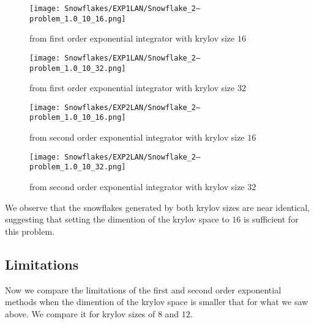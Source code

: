 \begin{figure}[H]
    \centering
    \begin{minipage}{0.49\textwidth}
        \texttt{[image: Snowflakes/EXP1LAN/Snowflake\_2--problem\_1.0\_10\_16.png]} %
        \caption{from first order exponential integrator with krylov size $16$}
        \label{fig:first order 16}
    \end{minipage}\hfill
    \centering
    \begin{minipage}{0.49\textwidth}
        \texttt{[image: Snowflakes/EXP1LAN/Snowflake\_2--problem\_1.0\_10\_32.png]} %
        \caption{from first order exponential integrator with krylov size $32$}
        \label{fig:first order 32}
    \end{minipage}\hfill
\end{figure}\begin{figure}[H]
    \centering
    \begin{minipage}{0.49\textwidth}
        \texttt{[image: Snowflakes/EXP2LAN/Snowflake\_2--problem\_1.0\_10\_16.png]} %
        \caption{from second order exponential integrator with krylov size $16$}
        \label{fig:second order 16}
    \end{minipage}\hfill
    \centering
    \begin{minipage}{0.49\textwidth}
        \texttt{[image: Snowflakes/EXP2LAN/Snowflake\_2--problem\_1.0\_10\_32.png]} %
        \caption{from second order exponential integrator with krylov size $32$}
        \label{fig:second order 32}
    \end{minipage}\hfill
\end{figure}

We observe that the snowflakes generated by both krylov sizes are near identical, 
suggesting that setting the dimention of the krylov space to $16$ is sufficient for this problem.\\

\subsection{Limitations}
Now we compare the limitations of the first and second order exponential methods when the dimention of the krylov space is smaller that for what we saw above.
We compare it for krylov sizes of $8$ and $12$.

